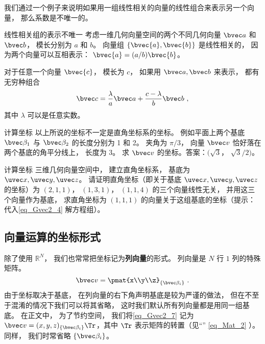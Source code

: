 我们通过一个例子来说明如果用一组线性相关的向量的线性组合来表示另一个向量， 那么系数是不唯一的。

\begin{example}{线性相关组的表示不唯一}
考虑一维几何向量空间的两个不同几何向量 $\bvec a$ 和 $\bvec b$， 模长分别为 $a$ 和 $b$。 向量组 $\{\bvec{a}, \bvec{b}\}$ 是线性相关的， 因为两个向量可以互相表示： $\bvec{a}=(a/b)\bvec{b}$。

对于任意一个向量 $\bvec{c}$， 模长为 $c$， 如果用 $\bvec a, \bvec b$ 来表示， 都有无穷种组合
\begin{equation}
\bvec c = \frac{\lambda}{a} \bvec a + \frac{c - \lambda}{b} \bvec b~,
\end{equation}
其中 $\lambda$ 可以是任意实数。
\end{example}

\begin{exercise}{计算坐标}
以上所说的坐标不一定是直角坐标系的坐标。 例如平面上两个基底 $\bvec \beta_1$ 与 $\bvec \beta_2$ 的长度分别为 1 和 2。 夹角为 $\pi/3$， 向量 $\bvec v$ 恰好落在两个基底的角平分线上， 长度为 3。 求 $\bvec v$ 的坐标。答案：$(\sqrt 3$， $\sqrt 3/2)$。
\end{exercise}

\begin{exercise}{计算坐标}
三维几何向量空间中， 建立直角坐标系， 基底为 $\uvec x, \uvec y, \uvec z$。 请证明直角坐标（即关于基底 $\uvec x, \uvec y, \uvec z$ 的坐标）为 $(2, 1, 1)$， $(1, 3, 1)$， $(1, 1, 4)$ 的三个向量线性无关， 并用这三个向量作为基底， 求直角坐标为 $(1, 1, 1)$ 的向量关于这组基底的坐标（提示：代入\autoref{eq_Gvec2_4} 解方程组）。
\end{exercise}

\subsection{向量运算的坐标形式}
除了使用 $\mathbb R^N$， 我们也常常把坐标记为\textbf{列向量}的形式。 列向量是 $N$ 行 $1$ 列的特殊矩阵。
\begin{equation}\label{eq_Gvec2_7}
\bvec v = \pmat{x\\y\\z}_{\{\bvec\beta_i\}}~.
\end{equation}
由于坐标取决于基底， 在列向量的右下角声明基底是较为严谨的做法， 但在不至于混淆的情况下我们可以将其省略， 这时我们默认所有列向量都是用同一组基底。 在正文中， 为了节约空间， 我们将\autoref{eq_Gvec2_7} 记为 $\bvec v = (x, y, z)_{\{\bvec\beta_i\}}\Tr$，其中 $\Tr$ 表示矩阵的转置（见“” \autoref{eq_Mat_2} ）。同样， 我们时常省略 $\{\bvec\beta_i\}$。

